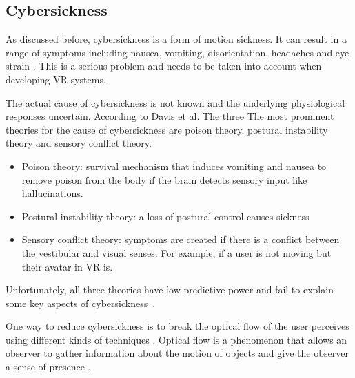 \subsection{Cybersickness}\label{cybersickness}

As discussed before, cybersickness is a form of motion sickness. It can
result in a range of symptoms including nausea, vomiting,
disorientation, headaches and eye strain
\cite{LaViola}. This is a serious problem and needs to
be taken into account when developing VR systems.

The actual cause of cybersickness is not
known and the underlying physiological responses uncertain. According to Davis et al. \cite{Davis} The three
The most prominent theories for the cause of cybersickness are poison
theory, postural instability theory and sensory conflict theory.

\begin{itemize}
\itemsep1pt\parskip0pt
\item
  Poison theory: survival mechanism that induces vomiting and nausea to
  remove poison from the body if the brain detects sensory input like
  hallucinations.\\
\item
  Postural instability theory: a loss of postural control causes
  sickness\\
\item
  Sensory conflict theory: symptoms are created if there is a conflict
  between the vestibular and visual senses. For example, if a user is not
  moving but their avatar in VR is.
\end{itemize}

Unfortunately, all three theories have low predictive power and fail to
explain some key aspects of cybersickness~\cite{Davis}.

One way to reduce cybersickness is to break the optical flow of the user
perceives using different kinds of techniques
\cite{Bhandari}. Optical flow is a phenomenon that
allows an observer to gather information about the motion of objects and
give the observer a sense of presence \cite{Gibson}.

